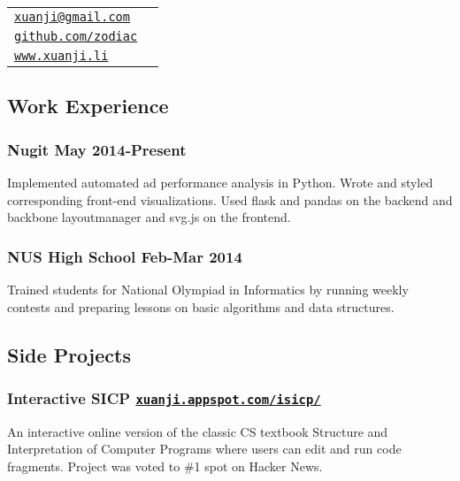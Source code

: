 \documentclass[letterpaper]{article}
\def\name{Li Xuanji}
\begin{document}
\vspace{0.25in}

\begin{minipage}{0.8\linewidth}
\resizebox{0.5\linewidth}{!}{\fontsize{30}{36}\selectfont \name}
\end{minipage}
\begin{minipage}{0.2\linewidth}
  \begin{tabular}{ll}
    \href{mailto:xuanji@gmail.com}{\tt xuanji@gmail.com} \\
    \href{https://github.com/zodiac}{\tt github.com/zodiac} \\
    \href{www.xuanji.li}{\tt www.xuanji.li}
  \end{tabular}
\end{minipage}

\vspace{2em}

\begin{center}
\section*{Work Experience}
\end{center}

\subsubsection*{Nugit \hfill May 2014-Present}
Implemented automated ad performance analysis in Python. Wrote and styled corresponding front-end visualizations. Used flask and pandas on the backend and backbone layoutmanager and svg.js on the frontend.

\subsubsection*{NUS High School \hfill Feb-Mar 2014}
Trained students for National Olympiad in Informatics by running weekly contests and preparing lessons on basic algorithms and data structures.

\vspace{1em}

\begin{center}
\section*{Side Projects}
\end{center}
\subsubsection*{Interactive SICP \hfill \href{http://xuanji.appspot.com/isicp/}{\tt xuanji.appspot.com/isicp/}}
An interactive online version of the classic CS textbook Structure and Interpretation of Computer Programs where users can edit and run code fragments. Project was voted to \#1 spot on Hacker News.
\end{document}
